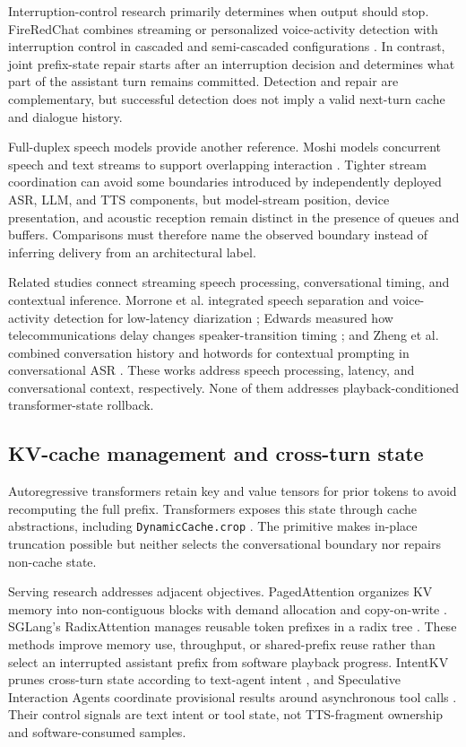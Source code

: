 Interruption-control research primarily determines when output should stop. FireRedChat combines streaming or personalized voice-activity detection with interruption control in cascaded and semi-cascaded configurations \citep{chen2025FireRedChat}. In contrast, joint prefix-state repair starts after an interruption decision and determines what part of the assistant turn remains committed. Detection and repair are complementary, but successful detection does not imply a valid next-turn cache and dialogue history.

Full-duplex speech models provide another reference. Moshi models concurrent speech and text streams to support overlapping interaction \citep{defossez2024Moshi}. Tighter stream coordination can avoid some boundaries introduced by independently deployed ASR, LLM, and TTS components, but model-stream position, device presentation, and acoustic reception remain distinct in the presence of queues and buffers. Comparisons must therefore name the observed boundary instead of inferring delivery from an architectural label.

Related studies connect streaming speech processing, conversational timing, and contextual inference. Morrone et al. integrated speech separation and voice-activity detection for low-latency diarization \citep{morrone2024LowLatencyDiarization}; Edwards measured how telecommunications delay changes speaker-transition timing \citep{edwards2025TelecommunicationsLatency}; and Zheng et al. combined conversation history and hotwords for contextual prompting in conversational ASR \citep{zheng2026MultilevelContextualPrompting}. These works address speech processing, latency, and conversational context, respectively. None of them addresses playback-conditioned transformer-state rollback.

\subsection{KV-cache management and cross-turn state}

Autoregressive transformers retain key and value tensors for prior tokens to avoid recomputing the full prefix. Transformers exposes this state through cache abstractions, including \texttt{DynamicCache.crop} \citep{huggingFace2025TransformersCacheUtils,huggingFace2025KVCacheStrategies}. The primitive makes in-place truncation possible but neither selects the conversational boundary nor repairs non-cache state.

Serving research addresses adjacent objectives. PagedAttention organizes KV memory into non-contiguous blocks with demand allocation and copy-on-write \citep{kwon2023PagedAttention}. SGLang's RadixAttention manages reusable token prefixes in a radix tree \citep{zheng2024SGLang}. These methods improve memory use, throughput, or shared-prefix reuse rather than select an interrupted assistant prefix from software playback progress. IntentKV prunes cross-turn state according to text-agent intent \citep{li2026IntentKV}, and Speculative Interaction Agents coordinate provisional results around asynchronous tool calls \citep{hooper2026SpeculativeInteractionAgents}. Their control signals are text intent or tool state, not TTS-fragment ownership and software-consumed samples.

